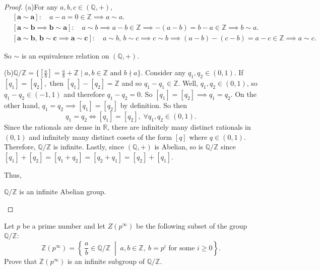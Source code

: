 \documentclass[addpoints,10pt]{exam}
\theoremstyle{plain}
\theoremstyle{definition}
\newtheorem{prob}[thm]{Problem}
\theoremstyle{plain}
\theoremstyle{plain}
\theoremstyle{definition}
\let\oldprob\prob
\let\endoldprob\endprob
\renewenvironment{prob}
  {\begin{singlespace}\oldprob}
  {\endoldprob\end{singlespace}}
\newcommand{\belowtitle}{\leavevmode\newline}
\newcommand{\QQ}{\ensuremath{\mathbb{Q}}}
\newcommand{\RR}{\ensuremath{\mathbb{R}}}
\newcommand{\ZZ}{\ensuremath{\mathbb{Z}}}
\begin{document}
\begin{proof}\belowtitle
    (a)\quad For any $a,b,c\in (\QQ,+),$
    \begin{align*}
        &\mathbf{[a\sim a]:}\quad a-a=0\in \ZZ \implies a\sim a.\\
        &\mathbf{[a\sim b\implies b\sim a]:}\quad a\sim b\implies a-b\in \ZZ \implies -(a-b)=b-a\in \ZZ\implies  b\sim a.\\
        &\mathbf{[a\sim b,\,b\sim c\implies a\sim c]:}\quad a\sim b,\,b\sim c\implies c\sim b\implies (a-b)-(c-b)=a-c\in \ZZ\implies a\sim c.
    \end{align*}

    So $\sim$ is an equivalence relation on $(\QQ,+)$.

    (b)\quad $\QQ/\ZZ=\{[\frac{a}{b}]=\frac{a}{b}+\ZZ \mid a,b\in \ZZ\text{ and }b\nmid a\}$. Consider any $q_{1},q_{2}\in (0,1)$. If $[q_{1}]=[q_{2}],$ then $[q_{1}]-[q_{2}]=\ZZ$ and so $q_{1}-q_{1}\in \ZZ$. Well, $q_{1},q_{2}\in (0,1)$, so $q_{1}-q_{2}\in (-1,1)$ and therefore $q_{1}-q_{2}=0$. So $[q_{1}]=[q_{2}]\implies q_{1}=q_{2}$. On the other hand, $q_{1}=q_{2}\implies [q_{1}]=[q_{2}]$ by definition. So then
    $$q_{1}=q_{2}\iff [q_{1}]=[q_{2}],\;\forall q_{1},q_{2}\in (0,1).$$
    Since the rationals are dense in $\RR$, there are infinitely many distinct rationals in $(0,1)$ and infinitely many distinct cosets of the form $[q]$ where $q\in (0,1)$. Therefore, $\QQ/\ZZ$ is infinite. Lastly, since $(\QQ,+)$ is Abelian, so is $\QQ/\ZZ$ since $[q_{1}]+[q_{2}]=[q_{1}+q_{2}]=[q_{2}+q_{1}]=[q_{2}]+[q_{1}]$.

    Thus,
    \begin{center}
    $\QQ/\ZZ$ is an infinite Abelian group.
    \end{center}
\end{proof}
\newpage
\begin{prob}
Let $p$ be a prime number and let $Z(p^\infty)$ be the following subset of the group $\mathbb{Q}/\mathbb{Z}$:
\[
\ZZ(p^\infty)=\left\{\, \frac{a}{b} \in \mathbb{Q}/\mathbb{Z} \;\middle|\; a,b\in\mathbb{Z},\ b=p^i \text{ for some } i \ge 0 \right\}.
\]
Prove that $\ZZ(p^\infty)$ is an infinite subgroup of $\mathbb{Q}/\mathbb{Z}$.
\end{prob}
\end{document}
